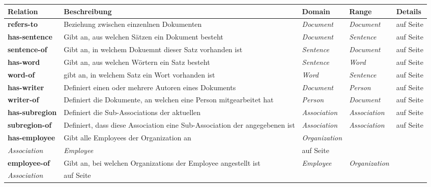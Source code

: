 \documentclass[
    11pt,
    latin1,
    a4paper,
    oneside
]{scrreprt}
\begin{document}
\begin{table}[h]
	\centering
	\begin{tabular}{ | l | p{4cm} | p{3cm} | l | p{3cm} | }
		\hline
		\textbf{Relation} & \textbf{Beschreibung} & \textbf{Domain} & \textbf{Range} & \textbf{Details} \\ \hline
		
		\textbf{refers-to} & Beziehung zwischen einzenlnen Dokumenten & \emph{Document} & \emph{Document} & \nameref{sec:rel_refersto} auf Seite \pageref{sec:rel_refersto} \\ \hline
		\textbf{has-sentence} & Gibt an, aus welchen S\"atzen ein Dokument besteht & \emph{Document} & \emph{Sentence} & \nameref{sec:rel_hassentence} auf Seite \pageref{sec:rel_hassentence} \\ \hline
		\textbf{sentence-of} & Gibt an, in welchem Dokuemnt dieser Satz vorhanden ist & \emph{Sentence} & \emph{Document} & \nameref{sec:rel_sentenceof} auf Seite \pageref{sec:rel_sentenceof} \\ \hline
		\textbf{has-word} & Gibt an, aus welchen W\"ortern ein Satz besteht & \emph{Sentence} & \emph{Word} & \nameref{sec:rel_hasword} auf Seite \pageref{sec:rel_hasword} \\ \hline
		\textbf{word-of} & gibt an, in welchem Satz ein Wort vorhanden ist & \emph{Word} & \emph{Sentence} & \nameref{sec:rel_wordof} auf Seite \pageref{sec:rel_wordof} \\ \hline
		
		\textbf{has-writer} & Definiert einen oder mehrere Autoren eines Dokuments & \emph{Document} & \emph{Person} & \nameref{sec:rel_haswriter} auf Seite \pageref{sec:rel_haswriter} \\ \hline
		\textbf{writer-of} & Definiert die Dokumente, an welchen eine Person mitgearbeitet hat & \emph{Person} & \emph{Document} & \nameref{sec:rel_writerof} auf Seite \pageref{sec:rel_writerof} \\ \hline
		
		\textbf{has-subregion} & Definiert die Sub-Associations der aktuellen & \emph{Association} & \emph{Association} & \nameref{sec:rel_hassubregion} auf Seite \pageref{sec:rel_hassubregion} \\ \hline
		\textbf{subregion-of} & Definiert, dass diese Association eine Sub-Association der angegebenen ist & \emph{Association} & \emph{Association} & \nameref{sec:rel_subregionof} auf Seite \pageref{sec:rel_subregionof} \\ \hline
		
		\textbf{has-employee} & Gibt alle Employees der Organization an & \emph{Organization} \\ \emph{Association} & \emph{Employee} & \nameref{sec:rel_hasemployee} auf Seite \pageref{sec:rel_hasemployee} \\ \hline
		\textbf{employee-of} & Gibt an, bei welchen Organizations der Employee angestellt ist & \emph{Employee} & \emph{Organization} \\ \emph{Association} & \nameref{sec:rel_employeeof} auf Seite \pageref{sec:rel_employeeof} \\ \hline
		

\end{tabular}
\end{table}
\end{document}
